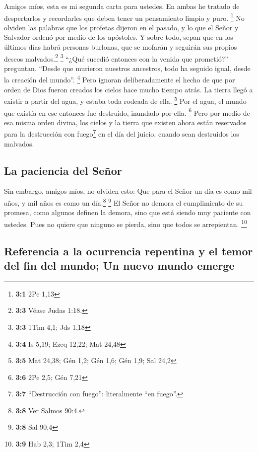  Amigos míos, esta es mi segunda carta para ustedes. En
ambas he tratado de despertarlos y recordarles que deben tener un
pensamiento limpio y puro. \footnote{\textbf{3:1} 2Pe 1,13}
 No olviden las palabras que los profetas dijeron en el
pasado, y lo que el Señor y Salvador ordenó por medio de los apóstoles.
 Y sobre todo, sepan que en los últimos días habrá
personas burlonas, que se mofarán y seguirán sus propios deseos
malvados.\footnote{\textbf{3:3} Véase Judas 1:18.} \footnote{\textbf{3:3}
  1Tim 4,1; Jds 1,18}  ``¿Qué sucedió entonces con la
venida que prometió?'' preguntan. ``Desde que murieron nuestros
ancestros, todo ha seguido igual, desde la creación del mundo''.
\footnote{\textbf{3:4} Is 5,19; Ezeq 12,22; Mat 24,48} 
Pero ignoran deliberadamente el hecho de que por orden de Dios fueron
creados los cielos hace mucho tiempo atrás. La tierra llegó a existir a
partir del agua, y estaba toda rodeada de ella. \footnote{\textbf{3:5}
  Mat 24,38; Gén 1,2; Gén 1,6; Gén 1,9; Sal 24,2}  Por el
agua, el mundo que existía en ese entonces fue destruido, inundado por
ella. \footnote{\textbf{3:6} 2Pe 2,5; Gén 7,21}  Pero por
medio de esa misma orden divina, los cielos y la tierra que existen
ahora están reservados para la destrucción con fuego\footnote{\textbf{3:7}
  ``Destrucción con fuego'': literalmente ``en fuego''.} en el día del
juicio, cuando sean destruidos los malvados.

\hypertarget{la-paciencia-del-seuxf1or}{%
\subsection{La paciencia del Señor}\label{la-paciencia-del-seuxf1or}}

 Sin embargo, amigos míos, no olviden esto: Que para el
Señor un día es como mil años, y mil años es como un día.\footnote{\textbf{3:8}
  Ver Salmos 90:4.} \footnote{\textbf{3:8} Sal 90,4}  El
Señor no demora el cumplimiento de su promesa, como algunos definen la
demora, sino que está siendo muy paciente con ustedes. Pues no quiere
que ninguno se pierda, sino que todos se arrepientan. \footnote{\textbf{3:9}
  Hab 2,3; 1Tim 2,4}

\hypertarget{referencia-a-la-ocurrencia-repentina-y-el-temor-del-fin-del-mundo-un-nuevo-mundo-emerge}{%
\subsection{Referencia a la ocurrencia repentina y el temor del fin del
mundo; Un nuevo mundo
emerge}\label{referencia-a-la-ocurrencia-repentina-y-el-temor-del-fin-del-mundo-un-nuevo-mundo-emerge}}

